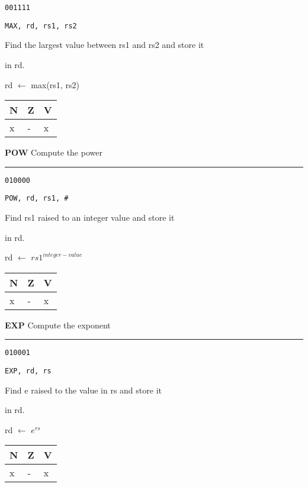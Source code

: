 \documentclass{article}
\begin{document}
{\large
	 \texttt{001111} \par
	\smallbreak
	 \texttt{MAX, rd, rs1, rs2} \par
	\smallbreak
	 Find the largest value between rs1 and rs2 and store it \par
	\makebox[3.5cm][l]{  } in rd. \par
	\smallbreak
	 rd $\leftarrow$ max(rs1, rs2) \par
	\smallbreak
	 \begin{tabular}{lll} N \quad & Z \quad & V \\ \hline x & - & x \\ \end{tabular}
}

\bigskip\bigskip

\flushleft
\LARGE\textbf{POW} \large \hfill Compute the power

\kern-3pt
\noindent\rule{16.5cm}{0.4pt}
\normalsize

{\large
	 \texttt{010000} \par
	\smallbreak
	 \texttt{POW, rd, rs1, \#<integer-value>} \par
	\smallbreak
	 Find rs1 raised to an integer value and store it \par
	\makebox[3.5cm][l]{  } in rd. \par
	\smallbreak
	 rd $\leftarrow$ $rs1^{integer-value}$ \par
	\smallbreak
	 \begin{tabular}{lll} N \quad & Z \quad & V \\ \hline x & - & x \\ \end{tabular}
}

\bigskip\bigskip

\flushleft
\LARGE\textbf{EXP} \large \hfill Compute the exponent

\kern-3pt
\noindent\rule{16.5cm}{0.4pt}
\normalsize

{\large
	 \texttt{010001} \par
	\smallbreak
	 \texttt{EXP, rd, rs} \par
	\smallbreak
	 Find e raised to the value in rs and store it \par
	\makebox[3.5cm][l]{  } in rd. \par
	\smallbreak
	 rd $\leftarrow$ $e^{rs}$ \par
	\smallbreak
	 \begin{tabular}{lll} N \quad & Z \quad & V \\ \hline x & - & x \\ \end{tabular}
}
\end{document}
